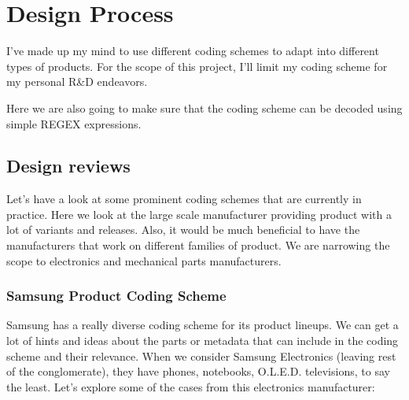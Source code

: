 \chapter{Design Process}

I've made up my mind to use different coding schemes to adapt into different types of products. For the scope of this project, I'll limit my coding scheme for my personal R\&D endeavors.

Here we are also going to make sure that the coding scheme can be decoded using simple REGEX expressions.

\section{Design reviews}

Let's have a look at some prominent coding schemes that are currently in practice. Here we look at the large scale manufacturer providing product with a lot of variants and releases. Also, it would be much beneficial to have the manufacturers that work on different families of product. We are narrowing the scope to electronics and mechanical parts manufacturers.

\subsection{Samsung Product Coding Scheme}

Samsung has a really diverse coding scheme for its product lineups. We can get a lot of hints and ideas about the parts or metadata that can include in the coding scheme and their relevance. When we consider Samsung Electronics (leaving rest of the conglomerate), they have phones, notebooks, O.L.E.D. televisions, to say the least. Let's explore some of the cases from this electronics manufacturer:

